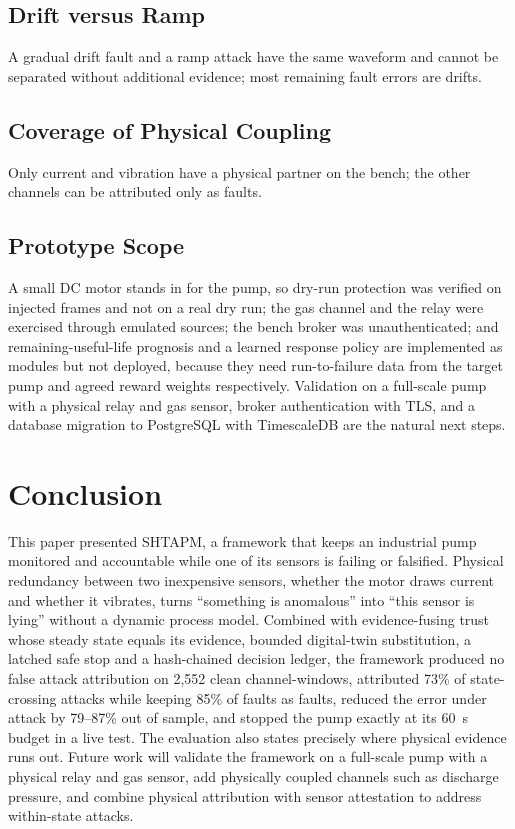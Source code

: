 \documentclass[11pt,a4paper]{article}
\begin{document}
\subsection{Drift versus Ramp}

A gradual drift fault and a ramp attack have the same waveform and cannot be separated without additional evidence; most remaining fault errors are drifts.

\subsection{Coverage of Physical Coupling}

Only current and vibration have a physical partner on the bench; the other channels can be attributed only as faults.

\subsection{Prototype Scope}

A small DC motor stands in for the pump, so dry-run protection was verified on injected frames and not on a real dry run; the gas channel and the relay were exercised through emulated sources; the bench broker was unauthenticated; and remaining-useful-life prognosis and a learned response policy are implemented as modules but not deployed, because they need run-to-failure data from the target pump and agreed reward weights respectively. Validation on a full-scale pump with a physical relay and gas sensor, broker authentication with TLS, and a database migration to PostgreSQL with TimescaleDB are the natural next steps.

\section{Conclusion}
\label{sec:conclusion}

This paper presented SHTAPM, a framework that keeps an industrial pump monitored and accountable while one of its sensors is failing or falsified. Physical redundancy between two inexpensive sensors, whether the motor draws current and whether it vibrates, turns ``something is anomalous'' into ``this sensor is lying'' without a dynamic process model. Combined with evidence-fusing trust whose steady state equals its evidence, bounded digital-twin substitution, a latched safe stop and a hash-chained decision ledger, the framework produced no false attack attribution on 2,552 clean channel-windows, attributed 73\% of state-crossing attacks while keeping 85\% of faults as faults, reduced the error under attack by 79--87\% out of sample, and stopped the pump exactly at its 60~s budget in a live test. The evaluation also states precisely where physical evidence runs out. Future work will validate the framework on a full-scale pump with a physical relay and gas sensor, add physically coupled channels such as discharge pressure, and combine physical attribution with sensor attestation to address within-state attacks.
\end{document}
